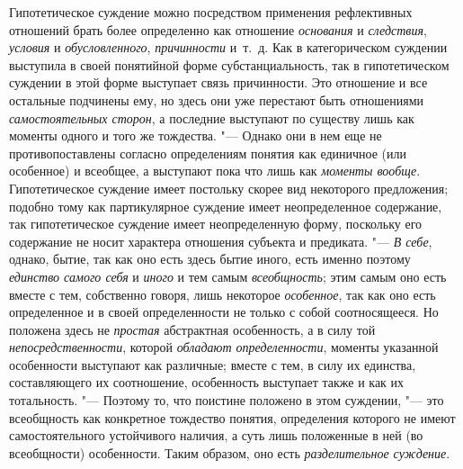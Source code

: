 Гипотетическое суждение можно посредством применения
рефлективных отношений брать более определенно как отношение
{\em основания} и
{\em следствия},
{\em условия} и
{\em обусловленного},
{\em причинности} и~т.~д.
Как в категорическом суждении выступила в своей понятийной форме
субстанциальность, так в гипотетическом суждении в этой форме выступает
связь причинности. Это отношение и все остальные подчинены ему, но здесь
они уже перестают быть отношениями
{\em самостоятельных сторон},
а последние выступают по существу лишь как моменты одного и
того же тождества. "--- Однако они в нем еще не
противопоставлены согласно определениям понятия как единичное (или
особенное) и всеобщее, а выступают пока что лишь как
{\em моменты вообще}.
Гипотетическое суждение имеет постольку скорее вид некоторого
предложения; подобно тому как партикулярное суждение имеет неопределенное
содержание, так гипотетическое суждение имеет неопределенную форму,
поскольку его содержание не носит характера отношения субъекта и
предиката. "--- {\em В себе},
однако, бытие, так как оно есть здесь бытие иного, есть
именно поэтому {\em единство самого
себя} и {\em иного}
и тем самым
{\em всеобщность}; этим
самым оно есть вместе с тем, собственно говоря, лишь некоторое
{\em особенное}, так как
оно есть определенное и в своей определенности не только с собой
соотносящееся. Но положена здесь не
{\em простая} абстрактная
особенность, а в силу той
{\em непосредственности},
которой {\em обладают
определенности}, моменты указанной особенности выступают как
различные; вместе с тем, в силу их единства, составляющего их соотношение,
особенность выступает также и как их тотальность. "---
Поэтому то, что поистине положено в этом суждении, "---
это всеобщность как конкретное тождество понятия,
определения которого не имеют самостоятельного устойчивого наличия, а суть
лишь положенные в ней (во всеобщности) особенности. Таким образом, оно есть
{\em разделительное суждение}.

